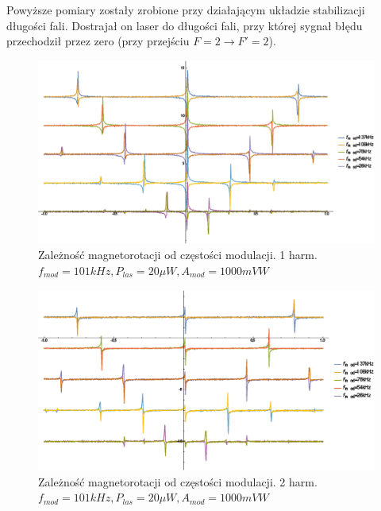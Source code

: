 \documentclass[a4paper,10pt]{article}
\begin{document}
Powyższe pomiary zostały zrobione przy działającym układzie stabilizacji długości fali. Dostrajał on laser do długości fali, przy której sygnał błędu przechodził przez zero (przy przejściu $F=2 \rightarrow F'=2$).

\begin{figure}[h!]
\centering
 \includegraphics[width=\textwidth]{panoramy_1H_odf.eps}
 \caption{Zależność magnetorotacji od częstości modulacji. 1 harm. $f_{mod}=101kHz, P_{las}=20 \mu W, A_{mod}=1000mV W$}
 \label{fig:panodf1}
\end{figure}

\begin{figure}[h!]
\centering
 \includegraphics[width=\textwidth]{panoramy_2H_odf.eps}
 \caption{Zależność magnetorotacji od częstości modulacji. 2 harm. $f_{mod}=101kHz, P_{las}=20 \mu W, A_{mod}=1000mV W$}
 \label{fig:panodf2}
\end{figure}
\end{document}
